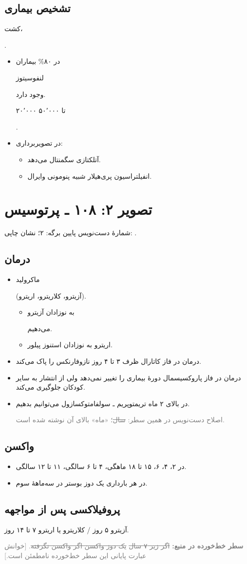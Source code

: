 \documentclass[11pt,a4paper]{article}
\newcommand{\en}[1]{\lr{#1}}
\newcommand{\hl}[1]{\begingroup\setlength{\fboxsep}{1pt}\colorbox{yellow!40}{\strut #1}\endgroup}
\newcommand{\rel}{\enspace\lr{\(\longleftarrow\)}\enspace}
\newcommand{\Pertussissheet}[1]{%
  \section*{تصویر #1: ۱۰۸ ـ پرتوسیس}
  {\small شمارهٔ دست‌نویس پایین برگه: #1؛ نشان چاپی: \en{GNOTE}.\par}}
\begin{document}
\subsection*{تشخیص بیماری}
\hl{کشت، \en{PCR}}.

\begin{itemize}
\item در ۸۰\% بیماران \hl{لنفوسیتوز} وجود دارد.
\en{WBC} \rel \hl{۲۰٬۰۰۰ تا ۵۰٬۰۰۰}.
\item در تصویربرداری:
\begin{itemize}
\item آتلکتازی سگمنتال می‌دهد.
\item انفیلتراسیون پری‌هیلار \rel شبیه پنومونی وایرال.
\end{itemize}
\end{itemize}

\clearpage
\Pertussissheet{۲}

\subsection*{درمان}
\begin{itemize}
\item \hl{ماکرولید} (آزیترو، کلاریترو، اریترو).
\begin{itemize}
\item \hl{به نوزادان آزیترو} می‌دهیم.
\item اریترو به نوزادان \rel استنوز پیلور.
\end{itemize}
\item درمان در فاز کاتارال \rel ظرف ۳ تا ۴ روز نازوفارنکس را پاک می‌کند.
\item درمان در فاز پاروکسیسمال \rel دورهٔ بیماری را تغییر نمی‌دهد ولی از انتشار به سایر کودکان جلوگیری می‌کند.
\item در بالای ۲ ماه \rel تریمتوپریم ـ سولفامتوکسازول می‌توانیم بدهیم.

{\small\textcolor{gray}{اصلاح دست‌نویس در همین سطر: \sout{سال}؛ «ماه» بالای آن نوشته شده است.}}
\end{itemize}

\subsection*{واکسن}
\begin{itemize}
\item در ۲، ۴، ۶، ۱۵ تا ۱۸ ماهگی، ۴ تا ۶ سالگی، ۱۱ تا ۱۲ سالگی.
\item در هر بارداری یک دوز بوستر در سه‌ماههٔ سوم.
\end{itemize}

\subsection*{پروفیلاکسی پس از مواجهه}
آزیترو ۵ روز / کلاریترو یا اریترو ۷ تا ۱۴ روز.

{\small\textcolor{gray}{\textbf{سطر خط‌خورده در منبع:}
\sout{اگر زیر ۷ سال} \rel \sout{یک دوز واکسن اگر واکسن نگرفته}.
[خوانش عبارت پایانی این سطر خط‌خورده نامطمئن است.]}}

\ifPertussisStandalone
\end{document}
